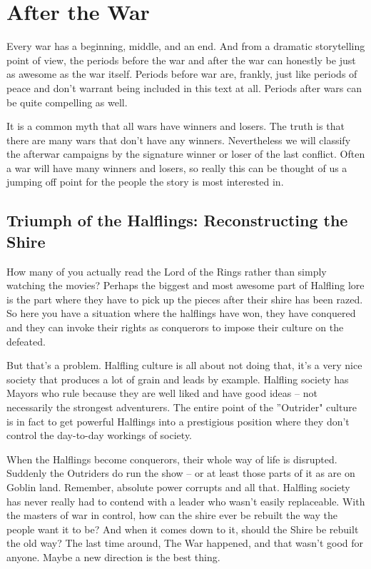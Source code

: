 \section{After the War}
\vspace*{-10pt}

Every war has a beginning, middle, and an end. And from a dramatic storytelling point of view, the periods before the war and after the war can honestly be just as awesome as the war itself. Periods before war are, frankly, just like periods of peace and don't warrant being included in this text at all. Periods after wars can be quite compelling as well.

It is a common myth that all wars have winners and losers. The truth is that there are many wars that don't have any winners. Nevertheless we will classify the afterwar campaigns by the signature winner or loser of the last conflict. Often a war will have many winners and losers, so really this can be thought of us a jumping off point for the people the story is most interested in.

\subsection{Triumph of the Halflings: Reconstructing the Shire}

How many of you actually read the Lord of the Rings rather than simply watching the movies? Perhaps the biggest and most awesome part of Halfling lore is the part where they have to pick up the pieces after their shire has been razed. So here you have a situation where the halflings have won, they have conquered and they can invoke their rights as conquerors to impose their culture on the defeated.

But that's a problem. Halfling culture is all about not doing that, it's a very nice society that produces a lot of grain and leads by example. Halfling society has Mayors who rule because they are well liked and have good ideas -- not necessarily the strongest adventurers. The entire point of the ''Outrider" culture is in fact to get powerful Halflings into a prestigious position where they don't control the day-to-day workings of society.

When the Halflings become conquerors, their whole way of life is disrupted. Suddenly the Outriders do run the show -- or at least those parts of it as are on Goblin land. Remember, absolute power corrupts and all that. Halfling society has never really had to contend with a leader who wasn't easily replaceable. With the masters of war in control, how can the shire ever be rebuilt the way the people want it to be? And when it comes down to it, should the Shire be rebuilt the old way? The last time around, The War happened, and that wasn't good for anyone. Maybe a new direction is the best thing.

